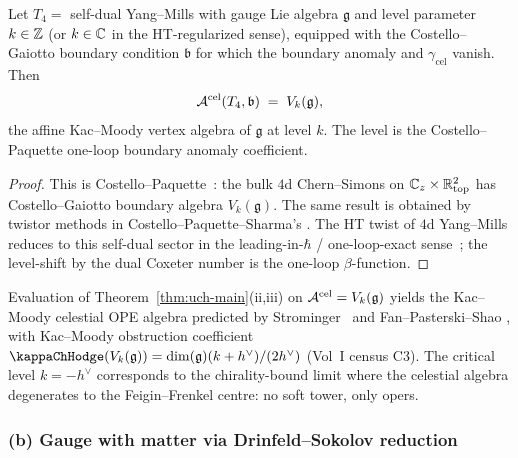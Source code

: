 \begin{proposition}
\label{prop:uch-sdgauge}
Let $T_4 = $ self-dual Yang--Mills with gauge Lie algebra $\mathfrak g$
and level parameter $k \in \mathbb Z$ (or $k \in \mathbb C$ in the
HT-regularized sense), equipped with the Costello--Gaiotto boundary
condition $\mathfrak b$ for which the boundary anomaly and
$\gamma_{\mathrm{cel}}$ vanish. Then
\[
\mathcal A^{\mathrm{cel}}(T_4,\mathfrak b) \;=\; V_k(\mathfrak g),
\]
the affine Kac--Moody vertex algebra of $\mathfrak g$ at level $k$.
The level is the Costello--Paquette one-loop boundary anomaly
coefficient.
\end{proposition}

\begin{proof}
This is Costello--Paquette~\cite[Thm.~1.1]{CostelloPaquetteTwistedSugraStates}:
the bulk $4$d Chern--Simons on $\mathbb C_z \times \mathbb R^2_{\text{top}}$ has
Costello--Gaiotto boundary algebra $V_k(\mathfrak g)$. The same result
is obtained by twistor methods in Costello--Paquette--Sharma's
\cite{CostelloPaquetteSharmaCelestial}. The HT twist of
$4$d Yang--Mills reduces to this self-dual sector in the
leading-in-$\hbar$ / one-loop-exact sense~\cite{CL16};
the level-shift by the dual Coxeter number is the one-loop
$\beta$-function.
\end{proof}

Evaluation of Theorem~\ref{thm:uch-main}(ii,iii) on
$\mathcal A^{\mathrm{cel}} = V_k(\mathfrak g)$ yields the Kac--Moody
celestial OPE algebra predicted by
Strominger~\cite{StromingerWInfinityCelestial} and Fan--Pasterski--Shao
\cite{FanPasterskiShaoCelOPE}, with Kac--Moody obstruction coefficient
$\kap(V_k(\mathfrak g)) = \dim(\mathfrak g) (k + h^\vee)/(2 h^\vee)$
(Vol~I census C3). The critical level $k = -h^\vee$ corresponds to
the chirality-bound limit where the celestial algebra degenerates to
the Feigin--Frenkel centre: no soft tower, only opers.

\subsubsection*{(b) Gauge with matter via Drinfeld--Sokolov reduction}

